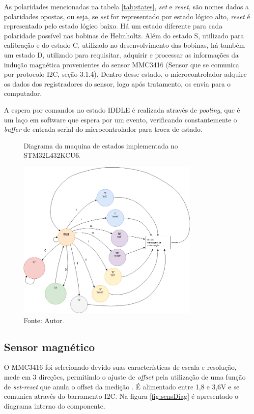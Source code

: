 As polaridades mencionadas na tabela \ref{tab:states}, \textit{set} e \textit{reset}, são nomes dados a polaridades opostas, ou seja, se \textit{set} for representado por estado lógico alto, \textit{reset} é representado pelo estado lógico baixo. Há um estado diferente para cada polaridade possível nas bobinas de Helmholtz. Além do estado S, utilizado para calibração e do estado C, utilizado no desenvolvimento das bobinas, há também um estado D, utilizado para requisitar, adquirir e processar as informações da indução magnética provenientes do sensor MMC3416 (Sensor que se comunica por protocolo I2C, seção 3.1.4). Dentro desse estado, o microcontrolador adquire os dados dos registradores do sensor, logo após tratamento, os envia para o computador.

A espera por comandos no estado IDDLE é realizada através de \textit{pooling}, que é um laço em software que espera por um evento, verificando constantemente o \textit{buffer} de entrada serial do microcontrolador para troca de estado.

\begin{figure}[H]
    \centering
     \caption{Diagrama da maquina de estados implementada no STM32L432KCU6.}
     \includegraphics[width=0.8\textwidth]{./img/imagensExplicacoes/stateMachine.png}
     \caption*{Fonte: Autor.}
     \label{fig:states}
\end{figure}

\subsection{Sensor magnético}

O MMC3416 \cite{mcc3416} foi selecionado devido suas características de escala e resolução, mede em 3 direções, permitindo o ajuste de \textit{offset} pela utilização de uma função de \textit{set-reset} que anula o offset da medição \cite{AN213Ref}. É alimentado entre 1,8 e 3,6V e se comunica através do barramento I2C. Na figura \ref{fig:sensDiag} é apresentado o diagrama interno do componente.

